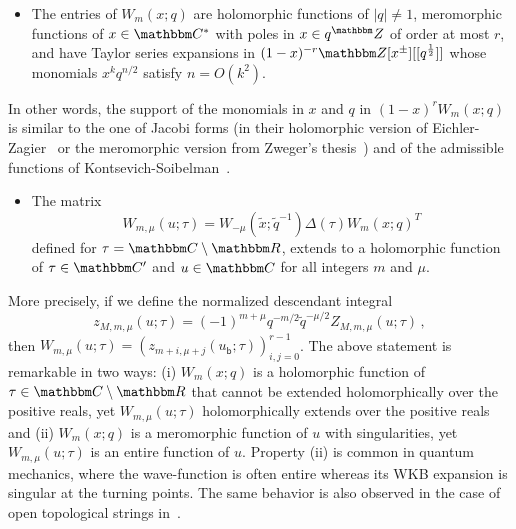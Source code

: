 \documentclass[12pt,reqno]{amsart}
\theoremstyle{definition}
\newtheorem{remark}[theorem]{Remark}
\def\BZ{\mathbbm Z}
\def\BR{\mathbbm R}
\def\BC{\mathbbm C}
\def\tq{\tilde{q}}
\def\tx{\tilde{x}}
\def\tx{\tilde{x}}
\def\ub{u_{\mathsf{b}}}
\begin{document}
\begin{itemize}
\item[(a)] The entries of $W_m(x;q)$ are holomorphic functions of
  $|q| \neq 1$, meromorphic functions of $x \in \BC^*$ with poles in
  $x \in q^\BZ$ of order at most $r$, and have Taylor series
  expansions in $(1-x)^{-r}\BZ[x^\pm][[q^{\frac{1}{2}}]]$ whose
  monomials $x^k q^{n/2}$ satisfy $n= O(k^2)$.
\end{itemize}
In other words, the support of the monomials in $x$ and $q$
in $(1-x)^r W_m(x;q)$ is similar to the one of Jacobi forms (in their
holomorphic version of Eichler-Zagier~\cite[Eqn.(3)]{EZ} or the
meromorphic version from Zweger's thesis~\cite[Chpt.3]{Zwegers:thesis})
and of the admissible functions of Kontsevich-Soibelman~\cite{KS}.

\begin{itemize}
\item[(b)] The matrix 
  \begin{equation}
    \label{Zfacx-desc}
    W_{m,\mu}(u;\tau) =
    W_{-\mu}(\tx;\tq^{-1}) \Delta(\tau) W_{m}(x;q)^T
  \end{equation}
  defined for $\tau=\BC\setminus\BR$, extends to a holomorphic
  function of $\tau \in \BC'$ and $u \in \BC$ for
  all integers $m$ and $\mu$.
\end{itemize}
More precisely, if we define the normalized descendant integral
\begin{equation}
  \label{Zr}
  z_{M,m,\mu}(u;\tau) =
  (-1)^{m+\mu}q^{-m/2}\tq^{-\mu/2}
  Z_{M,m,\mu}(u;\tau) \,,
\end{equation}
then $W_{m,\mu}(u;\tau) =(z_{m+i,\mu+j}(\ub;\tau))_{i,j=0}^{r-1}$.
The above statement is remarkable in two ways: (i) $W_m(x;q)$ is a
holomorphic function of $\tau \in \BC\setminus\BR$ that cannot be
extended holomorphically over the positive reals, yet
$W_{m,\mu}(u;\tau)$ holomorphically extends over the positive reals
and (ii) $W_m(x;q)$ is a meromorphic function of $u$ with
singularities, yet $W_{m,\mu}(u;\tau)$ is an entire function of $u$.
Property (ii) is common in quantum mechanics, where the wave-function
is often entire whereas its WKB expansion is singular at the turning
points. The same behavior is also observed in the case of open topological
strings in~\cite{Marino:exact}.

\end{document}
